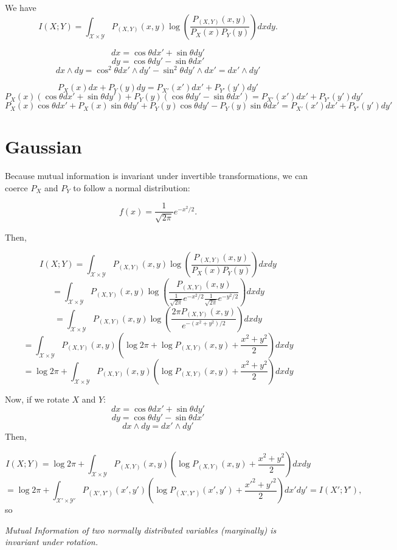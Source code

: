 \documentclass[12pt]{article}
\begin{document}
We have
$$I(X;Y) = \int_{\mathcal{X}\times\mathcal{Y}}P_{(X,Y)}(x,y)\log\left(\frac{P_{(X,Y)}(x,y)}{P_X(x)P_Y(y)}\right)dxdy.$$

$$dx = \cos \theta dx' + \sin \theta dy'$$
$$dy = \cos \theta dy' - \sin \theta dx'$$
$$dx \wedge dy = \cos^2\theta dx' \wedge dy' - \sin^2\theta dy' \wedge dx' = dx' \wedge dy'$$

$$P_{X}(x)dx + P_{Y}(y)dy = P_{X'}(x')dx' + P_{Y'}(y')dy'$$
$$P_{X}(x)(\cos\theta dx' + \sin\theta dy') + P_{Y}(y)(\cos\theta dy' - \sin\theta dx') = P_{X'}(x')dx' + P_{Y'}(y')dy'$$
$$P_{X}(x)\cos\theta dx' + P_{X}(x) \sin\theta dy' + P_{Y}(y)\cos\theta dy' - P_{Y}(y) \sin\theta dx' = P_{X'}(x')dx' + P_{Y'}(y')dy'$$

\section*{Gaussian}

Because mutual information is invariant under invertible transformations, we can coerce $P_X$ and $P_Y$ to follow a normal distribution:

$$f(x) = \frac{1}{\sqrt{2\pi}}e^{-x^2/2}.$$

Then,

$$I(X;Y) = \int_{\mathcal{X}\times\mathcal{Y}}P_{(X,Y)}(x,y)\log\left(\frac{P_{(X,Y)}(x,y)}{P_X(x)P_Y(y)}\right)dxdy$$
$$= \int_{\mathcal{X}\times\mathcal{Y}}P_{(X,Y)}(x,y)\log\left(\frac{P_{(X,Y)}(x,y)}{\frac{1}{\sqrt{2\pi}}e^{-x^2/2}\frac{1}{\sqrt{2\pi}}e^{-y^2/2}}\right)dxdy$$
$$= \int_{\mathcal{X}\times\mathcal{Y}}P_{(X,Y)}(x,y)\log\left(\frac{2\pi P_{(X,Y)}(x,y)}{e^{-(x^2+y^2)/2}}\right)dxdy$$
$$= \int_{\mathcal{X}\times\mathcal{Y}}P_{(X,Y)}(x,y)\left(\log 2\pi + \log P_{(X,Y)}(x,y) + \frac{x^2 + y^2}{2}\right)dxdy$$
$$= \log 2\pi + \int_{\mathcal{X}\times\mathcal{Y}}P_{(X,Y)}(x,y)\left(\log P_{(X,Y)}(x,y) + \frac{x^2 + y^2}{2}\right)dxdy$$

Now, if we rotate $X$ and $Y$:
$$dx = \cos \theta dx' + \sin \theta dy'$$
$$dy = \cos \theta dy' - \sin \theta dx'$$
$$dx \wedge dy = dx' \wedge dy'$$
Then,

$$I(X;Y) = \log 2\pi + \int_{\mathcal{X}\times\mathcal{Y}}P_{(X,Y)}(x,y)\left(\log P_{(X,Y)}(x,y) + \frac{x^2+y^2}{2}\right)dxdy$$
$$= \log 2\pi + \int_{\mathcal{X}'\times\mathcal{Y}'}P_{(X',Y')}(x',y')\left(\log P_{(X',Y')}(x',y') + \frac{x'^2+y'^2}{2}\right)dx'dy' = I(X';Y'),$$
so
\begin{center}
{\it Mutual Information of two normally distributed variables (marginally) is invariant under rotation.}
\end{center}
\end{document}
